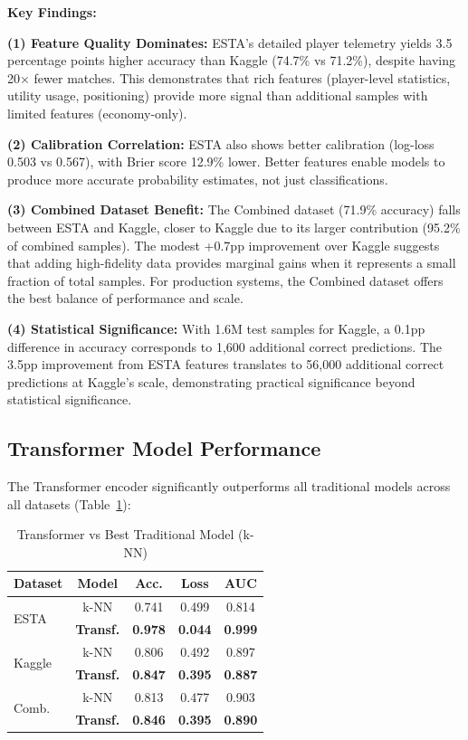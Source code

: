 \documentclass[10pt,twocolumn]{article}
\begin{document}
\textbf{Key Findings:}

\textbf{(1) Feature Quality Dominates:} ESTA's detailed player telemetry yields 3.5 percentage points higher accuracy than Kaggle (74.7\% vs 71.2\%), despite having 20× fewer matches. This demonstrates that rich features (player-level statistics, utility usage, positioning) provide more signal than additional samples with limited features (economy-only).

\textbf{(2) Calibration Correlation:} ESTA also shows better calibration (log-loss 0.503 vs 0.567), with Brier score 12.9\% lower. Better features enable models to produce more accurate probability estimates, not just classifications.

\textbf{(3) Combined Dataset Benefit:} The Combined dataset (71.9\% accuracy) falls between ESTA and Kaggle, closer to Kaggle due to its larger contribution (95.2\% of combined samples). The modest +0.7pp improvement over Kaggle suggests that adding high-fidelity data provides marginal gains when it represents a small fraction of total samples. For production systems, the Combined dataset offers the best balance of performance and scale.

\textbf{(4) Statistical Significance:} With 1.6M test samples for Kaggle, a 0.1pp difference in accuracy corresponds to 1,600 additional correct predictions. The 3.5pp improvement from ESTA features translates to 56,000 additional correct predictions at Kaggle's scale, demonstrating practical significance beyond statistical significance.

\subsection{Transformer Model Performance}

The Transformer encoder significantly outperforms all traditional models across all datasets (Table~\ref{tab:transformer}):

\begin{table}[h]
\centering
\caption{Transformer vs Best Traditional Model (k-NN)}
\label{tab:transformer}
\scriptsize
\setlength{\tabcolsep}{2.5pt}
\begin{tabular}{lcccc}
\toprule
\textbf{Dataset} & \textbf{Model} & \textbf{Acc.} & \textbf{Loss} & \textbf{AUC} \\
\midrule
\multirow{2}{*}{ESTA} & k-NN & 0.741 & 0.499 & 0.814 \\
 & \textbf{Transf.} & \textbf{0.978} & \textbf{0.044} & \textbf{0.999} \\
\midrule
\multirow{2}{*}{Kaggle} & k-NN & 0.806 & 0.492 & 0.897 \\
 & \textbf{Transf.} & \textbf{0.847} & \textbf{0.395} & \textbf{0.887} \\
\midrule
\multirow{2}{*}{Comb.} & k-NN & 0.813 & 0.477 & 0.903 \\
 & \textbf{Transf.} & \textbf{0.846} & \textbf{0.395} & \textbf{0.890} \\
\bottomrule
\end{tabular}
\end{table}
\end{document}
